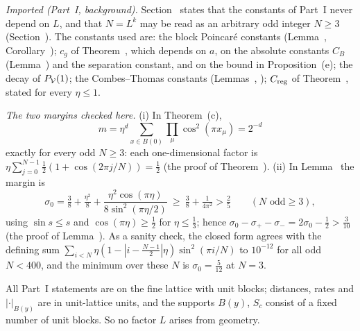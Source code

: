 \begin{detail}\label{d7:step1}
\emph{Imported (Part~I, background).} Section~ states that the constants of Part~I never depend on $L$, and that $N=L^k$ may be read as an arbitrary odd integer $N\ge3$ (Section~). The constants used are: the block Poincar\'e constants (Lemma~, Corollary~); $c_g$ of Theorem~, which depends on $a$, on the absolute constants $C_B$ (Lemma~) and the separation constant, and on the bound in Proposition~(e); the decay of $P_\mathcal V(1)$; the Combes--Thomas constants (Lemmas~, ); $C_{\rm reg}$ of Theorem~, stated for every $\eta\le1$.
\begin{step}
\emph{The two margins checked here.} (i) In Theorem~(c),
\[
m=\eta^d\sum_{x\in B(0)}\prod_\mu\cos^2(\pi x_\mu)=2^{-d}
\]
exactly for every odd $N\ge3$: each one-dimensional factor is $\eta\sum_{j=0}^{N-1}\frac12(1+\cos(2\pi j/N))=\frac12$ (the proof of Theorem~). (ii) In Lemma~ the margin is
\[
\sigma_0=\tfrac38+\tfrac{\eta^2}8+\frac{\eta^2\cos(\pi\eta)}{8\sin^2(\pi\eta/2)}\ \ge\ \tfrac38+\tfrac1{4\pi^2}>\tfrac25\qquad(N\text{ odd}\ge3),
\]
using $\sin s\le s$ and $\cos(\pi\eta)\ge\frac12$ for $\eta\le\frac13$; hence $\sigma_0-\sigma_+-\sigma_-=2\sigma_0-\frac12>\frac3{10}$ (the proof of Lemma~). As a sanity check, the closed form agrees with the defining sum $\sum_{i<N}\eta(1-|i-\frac{N-1}2|\eta)\sin^2(\pi i/N)$ to $10^{-12}$ for all odd $N<400$, and the minimum over these $N$ is $\sigma_0=\frac5{12}$ at $N=3$.
\end{step}
\begin{step}
All Part~I statements are on the fine lattice with unit blocks; distances, rates and $|\cdot|_{B(y)}$ are in unit-lattice units, and the supports $B(y)$, $S_c$ consist of a fixed number of unit blocks. So no factor $L$ arises from geometry.
\end{step}
\end{detail}

